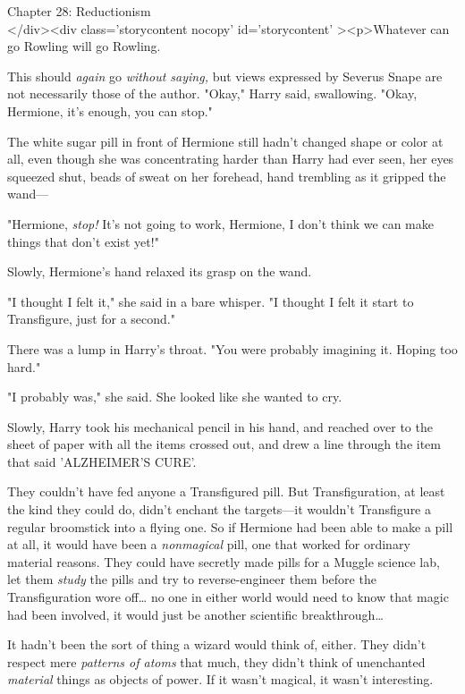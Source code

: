 
Chapter 28: Reductionism\\
</div><div  class='storycontent nocopy' id='storycontent' ><p>Whatever can go 
Rowling will go Rowling.

This should \emph{again} go \emph{without saying,} but views expressed by 
Severus Snape are not necessarily those of the author.
\sbreak
"Okay," Harry said, swallowing. "Okay, Hermione, it's enough, you can stop."

The white sugar pill in front of Hermione still hadn't changed shape or color 
at all, even though she was concentrating harder than Harry had ever seen, her 
eyes squeezed shut, beads of sweat on her forehead, hand trembling as it 
gripped the wand---

"Hermione, \emph{stop!} It's not going to work, Hermione, I don't think we can 
make things that don't exist yet!"

Slowly, Hermione's hand relaxed its grasp on the wand.

"I thought I felt it," she said in a bare whisper. "I thought I felt it start 
to Transfigure, just for a second."

There was a lump in Harry's throat. "You were probably imagining it. Hoping too 
hard."

"I probably was," she said. She looked like she wanted to cry.

Slowly, Harry took his mechanical pencil in his hand, and reached over to the 
sheet of paper with all the items crossed out, and drew a line through the item 
that said 'ALZHEIMER'S CURE'.

They couldn't have fed anyone a Transfigured pill. But Transfiguration, at 
least the kind they could do, didn't enchant the targets---it wouldn't 
Transfigure a regular broomstick into a flying one. So if Hermione had been 
able to make a pill at all, it would have been a \emph{nonmagical} pill, one 
that worked for ordinary material reasons. They could have secretly made pills 
for a Muggle science lab, let them \emph{study} the pills and try to 
reverse-engineer them before the Transfiguration wore off{\ldots} no one in 
either world would need to know that magic had been involved, it would just be 
another scientific breakthrough{\ldots}

It hadn't been the sort of thing a wizard would think of, either. They didn't 
respect mere \emph{patterns of atoms} that much, they didn't think of 
unenchanted \emph{material} things as objects of power. If it wasn't magical, 
it wasn't interesting.

